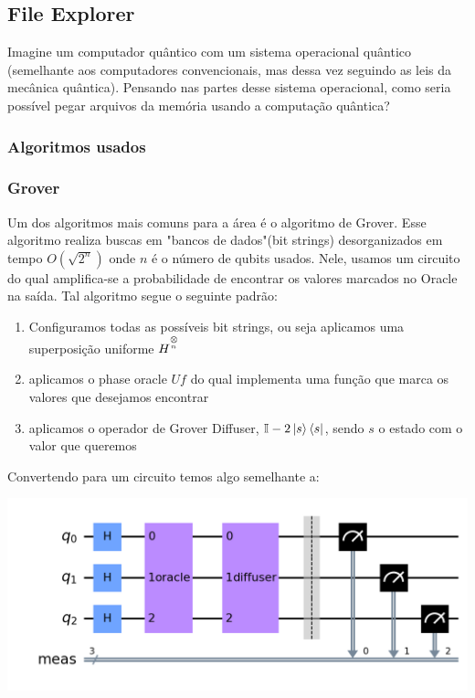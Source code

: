 \documentclass{article}
\newcommand{\tens}[1]{%
	\mathbin{\mathop{\otimes}\limits_{#1}}%
}
\begin{document}
\subsection{File Explorer} \label{file-explorer}

Imagine um computador quântico com um sistema operacional quântico (semelhante aos computadores convencionais, mas dessa vez seguindo as leis da mecânica quântica). Pensando nas partes desse sistema operacional, como seria possível pegar arquivos da memória usando a computação quântica?


\subsubsection{Algoritmos usados}

\subsubsection{Grover}
Um dos algoritmos mais comuns para a área é o algoritmo de Grover. Esse algoritmo realiza buscas em "bancos de dados"(bit strings) desorganizados em tempo $O(\sqrt{2^n})$ onde $n$ é o número de qubits usados. Nele, usamos um circuito do qual amplifica-se a probabilidade de encontrar os valores marcados no Oracle na saída.
Tal algoritmo segue o seguinte padrão: \
\begin{enumerate}
	\item{Configuramos todas as possíveis bit strings, ou seja aplicamos uma superposição uniforme $H^{\tens{^n}}$}
	\item{aplicamos o phase oracle $Uf$ do qual implementa uma função que marca os valores que desejamos encontrar}
	\item{aplicamos o operador de Grover Diffuser, $\mathbb{I} - 2 \mathinner{|{s}\rangle}\mathinner{\langle{s}|}$}, sendo $s$ o estado com o valor que queremos
\end{enumerate}

Convertendo para um circuito temos algo semelhante a:


\begin{center}
	\includegraphics[scale=0.3]{Grover.png}
	\label{fig:grover-default-circuit}
\end{center}
\end{document}
